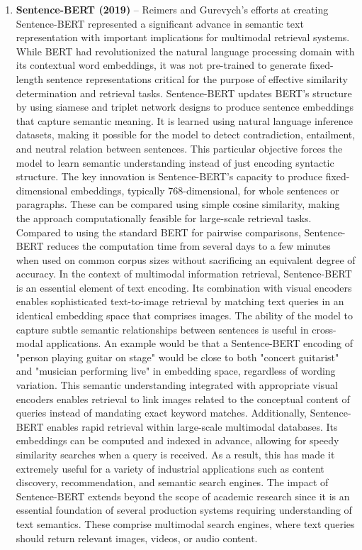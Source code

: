 \documentclass[conference]{IEEEtran}
\begin{document}
\begin{enumerate}
\item \textbf{Sentence-BERT (2019)} – Reimers and Gurevych's efforts at creating Sentence-BERT \cite{reimers2019sentence} represented a significant advance in semantic text representation with important implications for multimodal retrieval systems. While BERT had revolutionized the natural language processing domain with its contextual word embeddings, it was not pre-trained to generate fixed-length sentence representations critical for the purpose of effective similarity determination and retrieval tasks.
Sentence-BERT updates BERT's structure by using siamese and triplet network designs to produce sentence embeddings that capture semantic meaning. It is learned using natural language inference datasets, making it possible for the model to detect contradiction, entailment, and neutral relation between sentences. This particular objective forces the model to learn semantic understanding instead of just encoding syntactic structure.
The key innovation is Sentence-BERT's capacity to produce fixed-dimensional embeddings, typically 768-dimensional, for whole sentences or paragraphs. These can be compared using simple cosine similarity, making the approach computationally feasible for large-scale retrieval tasks. Compared to using the standard BERT for pairwise comparisons, Sentence-BERT reduces the computation time from several days to a few minutes when used on common corpus sizes without sacrificing an equivalent degree of accuracy.
In the context of multimodal information retrieval, Sentence-BERT is an essential element of text encoding. Its combination with visual encoders enables sophisticated text-to-image retrieval by matching text queries in an identical embedding space that comprises images. The ability of the model to capture subtle semantic relationships between sentences is useful in cross-modal applications.
An example would be that a Sentence-BERT encoding of "person playing guitar on stage" would be close to both "concert guitarist" and "musician performing live" in embedding space, regardless of wording variation. This semantic understanding integrated with appropriate visual encoders enables retrieval to link images related to the conceptual content of queries instead of mandating exact keyword matches.
Additionally, Sentence-BERT enables rapid retrieval within large-scale multimodal databases. Its embeddings can be computed and indexed in advance, allowing for speedy similarity searches when a query is received. As a result, this has made it extremely useful for a variety of industrial applications such as content discovery, recommendation, and semantic search engines. The impact of Sentence-BERT extends beyond the scope of academic research since it is an essential foundation of several production systems requiring understanding of text semantics. These comprise multimodal search engines, where text queries should return relevant images, videos, or audio content.


\end{enumerate}
\end{document}
